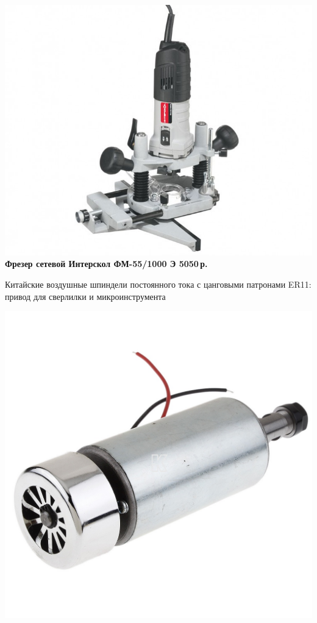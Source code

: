 \documentclass{magazine}
\begin{document}
{\noindent\href{http://www.kuvalda.ru/catalog/1867/27920/}{
\includegraphics[width=\columnwidth]{fig/00/InterskolFM55.jpg}}
\textbf{Фрезер сетевой Интерскол ФМ-55/1000 Э 5050\,р.}

\bigskip
Китайские воздушные шпиндели постоянного тока с цанговыми патронами ER11:
привод для сверлилки и микроинструмента

\noindent\includegraphics[width=\columnwidth]{fig/00/ER11.jpg}

}
\end{document}
